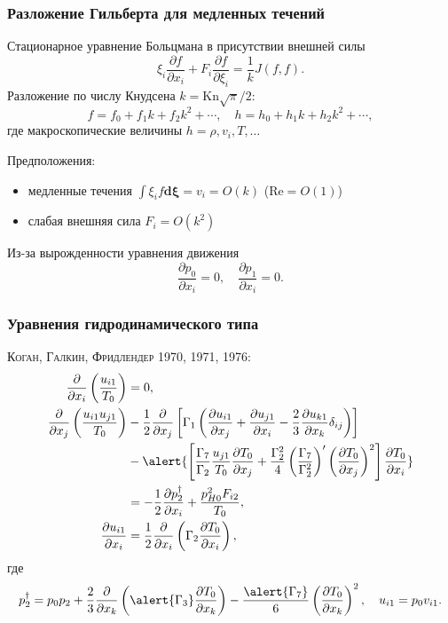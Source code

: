 \documentclass[mathserif]{beamer} %
\newcommand{\Kn}{\mathrm{Kn}}
\newcommand{\dd}{d}%
\newcommand{\pder}[2][]{\frac{\partial#1}{\partial#2}}
\newcommand{\dxi}{\boldsymbol{\dd\xi}}
\newcommand{\OO}[1]{O(#1)}
\newcommand{\Cite}[2][]{\alert{\textsc{#2 #1}}}
\begin{document}
\begin{frame}
    \frametitle{Разложение Гильберта для медленных течений}
    Стационарное уравнение Больцмана в присутствии внешней силы
    \begin{equation}\label{eq:Boltzmann}
        \xi_i\pder[f]{x_i} + F_i\pder[f]{\xi_i} = \frac1k J(f,f).
    \end{equation}
    Разложение по числу Кнудсена \(k=\Kn\sqrt\pi/2\):
    \begin{equation}\label{eq:expansion}
        f = f_0 + f_1k + f_2k^2 + \cdots, \quad h = h_0 + h_1k + h_2k^2 + \cdots,
    \end{equation}
    где макроскопические величины \(h = \rho, v_i, T, \dots\)
    \vspace{5pt}\pause

    Предположения:
    \begin{itemize}
        \item медленные течения \(\int\xi_i f\dxi = v_i = \OO{k}\) (\(\mathrm{Re} = \OO{1}\))
        \item слабая внешняя сила \(F_i = \OO{k^2}\)
    \end{itemize}
    Из-за вырожденности уравнения движения
    \begin{equation}
        \pder[p_0]{x_i} = 0, \quad \pder[p_1]{x_i} = 0.
    \end{equation}
\end{frame}

\begin{frame}
    \frametitle{Уравнения гидродинамического типа}
    \Cite[1970, 1971, 1976]{Коган, Галкин, Фридлендер}:
    \begin{align*}
        \pder{x_i}\left(\frac{u_{i1}}{T_0}\right) &= 0, \\
        \pder{x_j}\left(\frac{u_{i1}u_{j1}}{T_0}\right)
            &-\frac12\pder{x_j}\left[\Gamma_1\left(
                \pder[u_{i1}]{x_j} + \pder[u_{j1}]{x_i} - \frac23\pder[u_{k1}]{x_k}\delta_{ij}
            \right)\right] \notag\\
            &-\alert{\left[
                \frac{\Gamma_7}{\Gamma_2}\frac{u_{j1}}{T_0}\pder[T_0]{x_j}
                + \frac{\Gamma_2^2}4 \left(\frac{\Gamma_7}{\Gamma_2^2}\right)'
                    \left(\pder[T_0]{x_j}\right)^2
            \right]\pder[T_0]{x_i}} \notag\\
            &= -\frac12\pder[p_2^\dag]{x_i} + \frac{p_{H0}^2 F_{i2}}{T_{0}}, \\
        \pder[u_{i1}]{x_i} &= \frac12\pder{x_i}\left(\Gamma_2\pder[T_0]{x_i}\right),
    \end{align*}
    где
    \begin{equation*}
        p_2^\dag = p_0 p_2
            + \frac23\pder{x_k}\left(\alert{\Gamma_3}\pder[T_0]{x_k}\right)
            - \frac{\alert{\Gamma_7}}{6}\left(\pder[T_0]{x_k}\right)^2, \quad u_{i1} = p_0v_{i1}.
    \end{equation*}
\end{frame}
\end{document}
